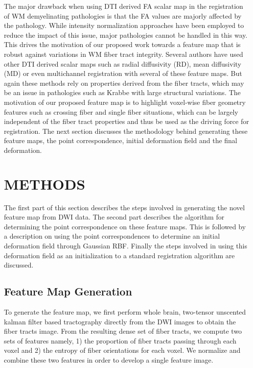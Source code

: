 \documentclass[]{spie}  %
\begin{document}
The major drawback when using DTI derived FA scalar map in the registration of WM demyelinating pathologies is that the FA values are majorly affected by the pathology. While intensity normalization approaches have been employed to reduce the impact of this issue, major pathologies cannot be handled in this way. This drives the motivation of our proposed work towards a feature map that is robust against variations in WM fiber tract integrity. Several authors have used other DTI derived scalar maps such as radial diffusivity (RD), mean diffusivity (MD) or even multichannel registration \cite{Alexand99} with several of these feature maps. But again these methods rely on properties derived from the fiber tracts, which may be an issue in pathologies such as Krabbe with large structural variations. The motivation of our proposed feature map is to highlight voxel-wise fiber geometry features such as crossing fiber and single fiber situations, which can be largely independent of the fiber tract properties and thus be used  as the driving force for registration. The next section discusses the methodology behind generating these feature maps, the point correspondence, initial deformation field and the final deformation.

\section{METHODS}
The first part of this section describes the steps involved in generating the novel feature map from DWI data. The second part describes the algorithm for determining the point correspondence on these feature maps. This is followed by a description on using the point correspondences to determine an initial deformation field through Gaussian RBF. Finally the steps involved in using this deformation field as an initialization to a standard registration algorithm are discussed.

\subsection{Feature Map Generation}
\label{subsec:FeatureMap}
To generate the feature map, we first perform whole brain, two-tensor unscented kalman filter based tractography directly from the DWI images to obtain the fiber tracts image. From the resulting dense set of fiber tracts, we compute two sets of  features  namely, 1) the proportion of fiber tracts passing through each voxel and 2) the entropy of fiber orientations for each voxel. We normalize and combine these two features in order to develop a single feature image.
\end{document}
